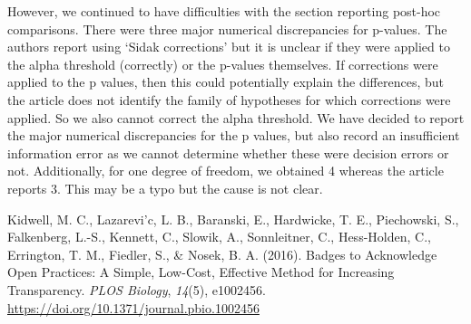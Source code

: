 \begin{appendix}
However, we continued to have difficulties with the section reporting
post-hoc comparisons. There were three major numerical discrepancies for
p-values. The authors report using `Sidak corrections' but it is unclear
if they were applied to the alpha threshold (correctly) or the p-values
themselves. If corrections were applied to the p values, then this could
potentially explain the differences, but the article does not identify
the family of hypotheses for which corrections were applied. So we also
cannot correct the alpha threshold. We have decided to report the major
numerical discrepancies for the p values, but also record an
insufficient information error as we cannot determine whether these were
decision errors or not. Additionally, for one degree of freedom, we
obtained 4 whereas the article reports 3. This may be a typo but the
cause is not clear.

\hypertarget{refs}{}
\leavevmode\hypertarget{ref-kidwell2016}{}%
Kidwell, M. C., Lazarevi\a'c, L. B., Baranski, E., Hardwicke, T. E.,
Piechowski, S., Falkenberg, L.-S., Kennett, C., Slowik, A., Sonnleitner,
C., Hess-Holden, C., Errington, T. M., Fiedler, S., \& Nosek, B. A.
(2016). Badges to Acknowledge Open Practices: A Simple, Low-Cost,
Effective Method for Increasing Transparency. \emph{PLOS Biology},
\emph{14}(5), e1002456.
\url{https://doi.org/10.1371/journal.pbio.1002456}
\end{appendix}

